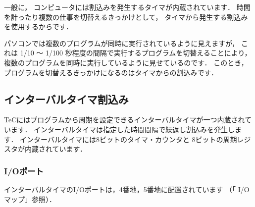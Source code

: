 一般に，
コンピュータには割込みを発生するタイマが内蔵されています．
時間を計ったり複数の仕事を切替えるきっかけとして，
タイマから発生する割込みを使用するからです．

パソコンでは複数のプログラムが同時に実行されているように見えますが，
これは 1/10 〜 1/100 秒程度の間隔で実行するプログラムを切替えることにより，
複数のプログラムを同時に実行しているように見せているのです．
このとき，プログラムを切替えるきっかけになるのはタイマからの割込みです．

\subsection{インターバルタイマ割込み}

TeCにはプログラムから周期を設定できるインターバルタイマが一つ内蔵されています．
インターバルタイマは指定した時間間隔で繰返し割込みを発生します．
インターバルタイマには8ビットのタイマ・カウンタと
8ビットの周期レジスタが内蔵されています．

\subsubsection{I/Oポート}
インターバルタイマのI/Oポートは，4番地，5番地に配置されています
（「 I/Oマップ」参照）．

